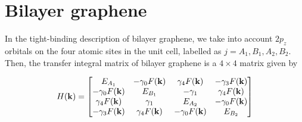 \section{Bilayer graphene}

In the tight-binding description of bilayer graphene, we take into account $2p_z$ orbitals on the four atomic sites in the unit cell, labelled as $j = A_1, B_1, A_2, B_2$. Then, the transfer integral matrix of bilayer graphene is a $4\times 4$  matrix given by \cite{McCann_2013}

\begin{equation}
    H(\mathbf{k})=
    \begin{bmatrix}
        E_{A_1} & -\gamma_0 F(\mathbf{k}) & \gamma_4 F(\mathbf{k}) & -\gamma_3 F(\mathbf{k})\\
        -\gamma_0 F(\mathbf{k}) & E_{B_1} & -\gamma_1 & \gamma_4 F(\mathbf{k})\\
        \gamma_4 F(\mathbf{k}) & \gamma_1 & E_{A_2} & -\gamma_0 F(\mathbf{k})\\
        -\gamma_3 F(\mathbf{k})& \gamma_4 F(\mathbf{k})& -\gamma_0 F(\mathbf{k}) & E_{B_2}
    \end{bmatrix}
\end{equation}


